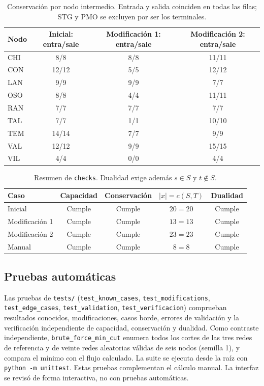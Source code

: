 \documentclass[12pt, a4paper]{article}
\begin{document}
\begin{table}[H]
  \centering
  \small
  \begin{tabular}{lccc}
    \toprule
    Nodo & Inicial: entra/sale & Modificación 1: entra/sale & Modificación 2: entra/sale \\
    \midrule
    CHI & 8/8 & 8/8 & 11/11 \\
    CON & 12/12 & 5/5 & 12/12 \\
    LAN & 9/9 & 9/9 & 7/7 \\
    OSO & 8/8 & 4/4 & 11/11 \\
    RAN & 7/7 & 7/7 & 7/7 \\
    TAL & 7/7 & 1/1 & 10/10 \\
    TEM & 14/14 & 7/7 & 9/9 \\
    VAL & 12/12 & 9/9 & 15/15 \\
    VIL & 4/4 & 0/0 & 4/4 \\
    \bottomrule
  \end{tabular}
  \caption{Conservación por nodo intermedio. Entrada y salida coinciden en todas las filas; STG y PMO se excluyen por ser los terminales.}
  \label{tab:conservacion_configuraciones}
\end{table}

\begin{table}[H]
  \centering
  \small
  \begin{tabular}{lcccc}
    \toprule
    Caso & Capacidad & Conservación & $\lvert x\rvert=c(S,T)$ & Dualidad \\
    \midrule
    Inicial & Cumple & Cumple & $20=20$ & Cumple \\
    Modificación 1 & Cumple & Cumple & $13=13$ & Cumple \\
    Modificación 2 & Cumple & Cumple & $23=23$ & Cumple \\
    Manual & Cumple & Cumple & $8=8$ & Cumple \\
    \bottomrule
  \end{tabular}
  \caption{Resumen de \texttt{checks}. Dualidad exige además $s\in S$ y $t\notin S$.}
  \label{tab:checks}
\end{table}

\subsection{Pruebas automáticas}
Las pruebas de \texttt{tests/} (\texttt{test\_known\_cases}, \texttt{test\_modifications}, \texttt{test\_edge\_cases}, \texttt{test\_validation}, \texttt{test\_verificacion}) comprueban resultados conocidos, modificaciones, casos borde, errores de validación y la verificación independiente de capacidad, conservación y dualidad. Como contraste independiente, \texttt{brute\_force\_min\_cut} enumera todos los cortes de las tres redes de referencia y de veinte redes aleatorias válidas de seis nodos (semilla 1), y compara el mínimo con el flujo calculado. La suite se ejecuta desde la raíz con \texttt{python -m unittest}. Estas pruebas complementan el cálculo manual. La interfaz se revisó de forma interactiva, no con pruebas automáticas.
\end{document}
